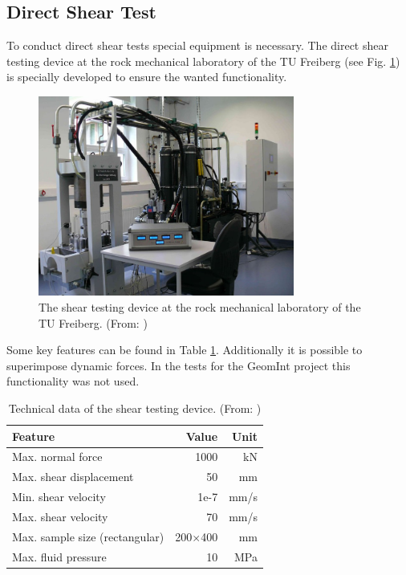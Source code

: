 \subsection{Direct Shear Test}

To conduct direct shear tests special equipment is necessary. The direct shear testing device at the rock mechanical laboratory of the TU Freiberg (see Fig. \ref{fig:ExpCNLShearMachine}) is specially developed to ensure the wanted functionality.

\begin{figure}[!ht]
\begin{center}
\includegraphics[width=0.75\textwidth]{./figures/ExpShearMachine.jpg}
\end{center}
\caption{The shear testing device at the rock mechanical laboratory of the TU Freiberg. (From: \cite{Konietzky2012})}
\label{fig:ExpCNLShearMachine}
\end{figure}

Some key features can be found in Table \ref{table:ExpCNLDeviceTechnicalData}. Additionally it is possible to superimpose dynamic forces. In the tests for the GeomInt project this functionality was not used.

\begin{table}[!ht]
\begin{center}
\begin{tabular}{l r r}
Feature & Value & Unit\\
\hline
Max. normal force & 1000 & kN\\
Max. shear displacement & 50 &mm\\
Min. shear velocity & 1e-7 & mm/s\\
Max. shear velocity & 70 & mm/s\\
Max. sample size (rectangular) & 200$\times$400 & mm\\
Max. fluid pressure & 10 & MPa\\
\end{tabular}
\caption{Technical data of the shear testing device. (From: \cite{Konietzky2012})}
\label{table:ExpCNLDeviceTechnicalData}
\end{center}
\end{table}

